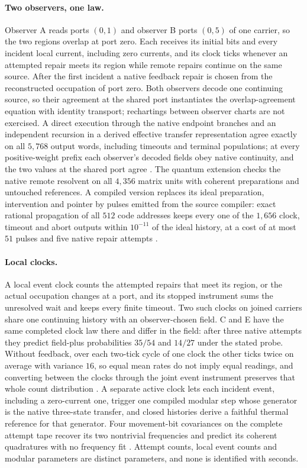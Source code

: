 \documentclass[11pt]{article}
\theoremstyle{definition}
\theoremstyle{remark}
\begin{document}
\paragraph{Two observers, one law.} Observer A reads ports $(0,1)$ and
observer B ports $(0,5)$ of one carrier, so the two regions overlap at port
zero. Each receives its initial bits and every incident local current,
including zero currents, and its clock ticks whenever an attempted repair
meets its region while remote repairs continue on the same source. After the
first incident a native feedback repair is chosen from the reconstructed
occupation of port zero. Both observers decode one continuing source, so
their agreement at the shared port instantiates the overlap-agreement
equation with identity transport; rechartings between observer charts are
not exercised. A direct execution through the native endpoint
branches and an independent recursion in a derived effective transfer
representation agree exactly on all $5{,}768$ output words, including timeouts and
terminal populations; at every positive-weight prefix each observer's
decoded fields obey native continuity, and the two values at the shared port
agree \cite{ophcorrespondence}. The quantum extension checks the native remote
resolvent on all $4{,}356$ matrix units with coherent preparations and
untouched references. A compiled version replaces its ideal preparation,
intervention and pointer by pulses emitted from the source compiler: exact
rational propagation of all $512$ code addresses keeps every one of the
$1{,}656$ clock, timeout and abort outputs within $10^{-11}$ of the ideal
history, at a cost of at most $51$ pulses and five native repair attempts
\cite{ophcompiledclock}.

\paragraph{Local clocks.} A local event clock counts the attempted repairs
that meet its region, or the actual occupation changes at a port, and its
stopped instrument sums the unresolved wait and keeps every finite timeout.
Two such clocks on joined carriers share one continuing history with an
observer-chosen field. C and E have the same completed clock law there and
differ in the field: after three native attempts they predict field-plus probabilities $35/54$
and $14/27$ under the stated probe. Without feedback, over each two-tick
cycle of one clock the other ticks twice on average with variance $16$, so equal mean rates do
not imply equal readings, and converting between the clocks through the joint
event instrument preserves that whole count distribution
\cite{ophjointclock}. A separate active clock lets each incident event,
including a zero-current one, trigger one compiled modular step whose
generator is the native three-state transfer, and closed histories derive a
faithful thermal reference for that generator. Four movement-bit covariances
on the complete attempt tape recover its two nontrivial frequencies and
predict its coherent quadratures with no frequency fit
\cite{ophpredictions}. Attempt counts, local event counts and modular
parameters are distinct parameters, and none is identified with seconds.
\end{document}
